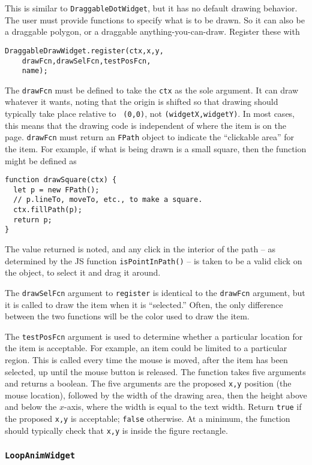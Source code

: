 \documentclass[10pt]{article}
\begin{document}
This is similar to {\tt DraggableDotWidget}, but it has no default
drawing behavior. The user must provide functions to specify what is
to be drawn. So it can also be a draggable polygon, or a draggable
anything-you-can-draw. Register these with
\begin{verbatim}
DraggableDrawWidget.register(ctx,x,y,
    drawFcn,drawSelFcn,testPosFcn,
    name);
\end{verbatim}
The {\tt drawFcn} must be defined to take the {\tt ctx} as the sole
argument. It can draw whatever it wants, noting that the origin is
shifted so that drawing should typically take place relative to {\tt
  (0,0)}, not {\tt (widgetX,widgetY)}. In most cases, this means
that the drawing code is independent of where the item is on the
page. {\tt drawFcn} must return an {\tt FPath} object to indicate
the ``clickable area'' for the item. For example, if what is being
drawn is a small square, then the function might be defined as
\begin{verbatim}
function drawSquare(ctx) {
  let p = new FPath();
  // p.lineTo, moveTo, etc., to make a square.
  ctx.fillPath(p);
  return p;
}
\end{verbatim}
The value returned is noted, and any click in the interior of the path
-- as determined by the JS function {\tt isPointInPath()} -- 
is taken to be a valid click on the object, to select it and drag it around.

The {\tt drawSelFcn} argument to {\tt register} is identical to the
{\tt drawFcn} argument, but it is called to draw the item when it is
``selected.'' Often, the only difference between the two functions
will be the color used to draw the item.

The {\tt testPosFcn} argument is used to determine whether a
particular location for the item is acceptable. For example, an item
could be limited to a particular region. This is called every time the
mouse is moved, after the item has been selected, up until the mouse
button is released. The function takes five arguments and returns a
boolean. The five arguments are the proposed {\tt x,y} position (the
mouse location), followed by the width of the drawing area, then the
height above and below the $x$-axis, where the width is equal to the
text width. Return {\tt true} if the 
proposed {\tt x,y} is acceptable; {\tt false} otherwise. At a minimum,
the function should typically check that {\tt x,y} is inside the
figure rectangle.

\subsubsection{\tt LoopAnimWidget}
\end{document}
